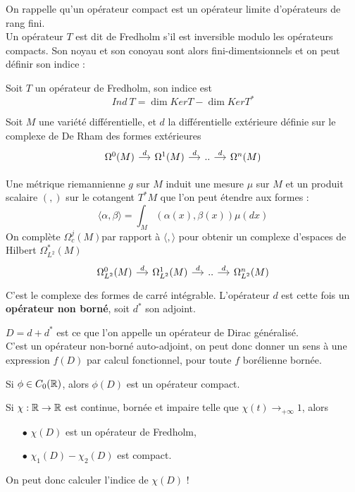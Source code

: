 \documentclass{beamer}
\begin{document}
\begin{frame}
On rappelle qu'un opérateur compact est un opérateur limite d'opérateurs de rang fini. \\
Un opérateur $T$ est dit de Fredholm s'il est inversible modulo les opérateurs compacts. Son noyau et son conoyau sont alors fini-dimentsionnels et on peut définir son indice :
\begin{definition}Soit $T$ un opérateur de Fredholm, son indice est
\[Ind\ T = \dim Ker T-\dim Ker T^*\] 
\end{definition}
Soit $M$ une variété différentielle, et $d$ la différentielle extérieure définie sur le complexe de De Rham des formes extérieures
\[\begin{tikzcd}[ampersand replacement=\&,column sep = small]
\Omega^0(M) \arrow{r}{d} \& \Omega^1(M) \arrow{r}{d} \& .. \arrow{r}{d} \& \Omega^n(M)  
\end{tikzcd}\]
\end{frame}

\begin{frame}
Une métrique riemannienne $g$ sur $M$ induit une mesure $\mu$ sur $M$ et un produit scalaire $(,)$ sur le cotangent $T^* M$ que l'on peut étendre aux formes :
\[\langle \alpha,\beta\rangle = \int_M (\alpha(x),\beta(x))\mu(dx)\]
On complète $\Omega^j_c(M)$par rapport à $\langle,\rangle$ pour obtenir un complexe d'espaces de Hilbert $\Omega^*_{L^2}(M)$
\[\begin{tikzcd}[ampersand replacement=\&,column sep = small]
\Omega_{L^2}^0(M) \arrow{r}{d} \& \Omega_{L^2}^1(M) \arrow{r}{d} \& .. \arrow{r}{d} \& \Omega_{L^2}^n(M)  
\end{tikzcd}\]
C'est le complexe des formes de carré intégrable. L'opérateur $d$ est cette fois un \textbf{opérateur non borné}, soit $d^*$ son adjoint.
\end{frame}

\begin{frame}
$D= d+d^*$ est ce que l'on appelle un opérateur de Dirac généralisé. \\
C'est un opérateur non-borné auto-adjoint, on peut donc donner un sens à une expression $f(D)$ par calcul fonctionnel, pour toute $f$ borélienne bornée.\\
\begin{thm}
Si $\phi\in C_0(\mathbb R)$, alors $\phi(D)$ est un opérateur compact.
\end{thm}

Si $\chi : \mathbb R\rightarrow \mathbb R$ est continue, bornée et impaire telle que $\chi (t)\rightarrow_{+\infty} 1$, alors 
\begin{itemize}
\item[$\bullet$] $\chi(D)$ est un opérateur de Fredholm,
\item[$\bullet$] $\chi_1(D)-\chi_2(D)$ est compact.
\end{itemize}
On peut donc calculer l'indice de $\chi(D)$ !
\end{frame}
\end{document}
